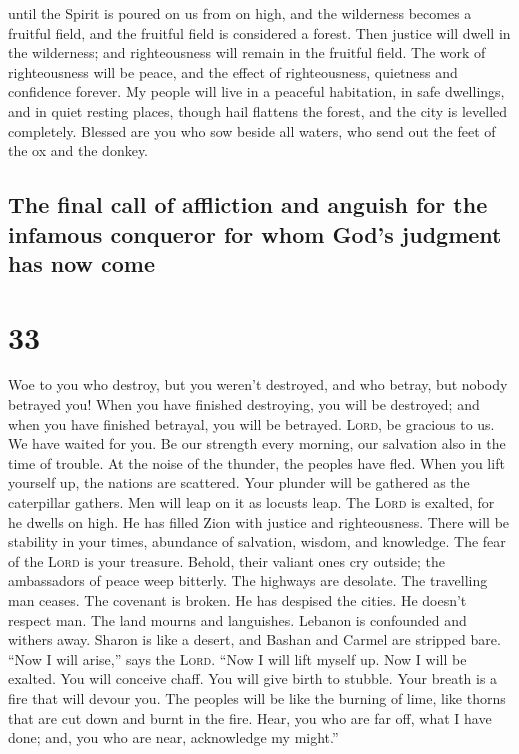  until the Spirit is poured on us from on high, and the
wilderness becomes a fruitful field, and the fruitful field is
considered a forest.  Then justice will dwell in the
wilderness; and righteousness will remain in the fruitful field.
 The work of righteousness will be peace, and the effect
of righteousness, quietness and confidence forever.  My
people will live in a peaceful habitation, in safe dwellings, and in
quiet resting places,  though hail flattens the forest,
and the city is levelled completely.  Blessed are you who
sow beside all waters, who send out the feet of the ox and the donkey.

\hypertarget{the-final-call-of-affliction-and-anguish-for-the-infamous-conqueror-for-whom-gods-judgment-has-now-come}{%
\subsection{The final call of affliction and anguish for the infamous
conqueror for whom God's judgment has now
come}\label{the-final-call-of-affliction-and-anguish-for-the-infamous-conqueror-for-whom-gods-judgment-has-now-come}}

\hypertarget{section-32}{%
\section{33}\label{section-32}}

 Woe to you who destroy, but you weren't destroyed, and
who betray, but nobody betrayed you! When you have finished destroying,
you will be destroyed; and when you have finished betrayal, you will be
betrayed.  \textsc{Lord}, be gracious to us. We have
waited for you. Be our strength every morning, our salvation also in the
time of trouble.  At the noise of the thunder, the peoples
have fled. When you lift yourself up, the nations are scattered.
 Your plunder will be gathered as the caterpillar gathers.
Men will leap on it as locusts leap.  The \textsc{Lord} is
exalted, for he dwells on high. He has filled Zion with justice and
righteousness.  There will be stability in your times,
abundance of salvation, wisdom, and knowledge. The fear of the
\textsc{Lord} is your treasure.  Behold, their valiant
ones cry outside; the ambassadors of peace weep bitterly. 
The highways are desolate. The travelling man ceases. The covenant is
broken. He has despised the cities. He doesn't respect man.
 The land mourns and languishes. Lebanon is confounded and
withers away. Sharon is like a desert, and Bashan and Carmel are
stripped bare.  ``Now I will arise,'' says the
\textsc{Lord}. ``Now I will lift myself up. Now I will be exalted.
 You will conceive chaff. You will give birth to stubble.
Your breath is a fire that will devour you.  The peoples
will be like the burning of lime, like thorns that are cut down and
burnt in the fire.  Hear, you who are far off, what I
have done; and, you who are near, acknowledge my might.''

